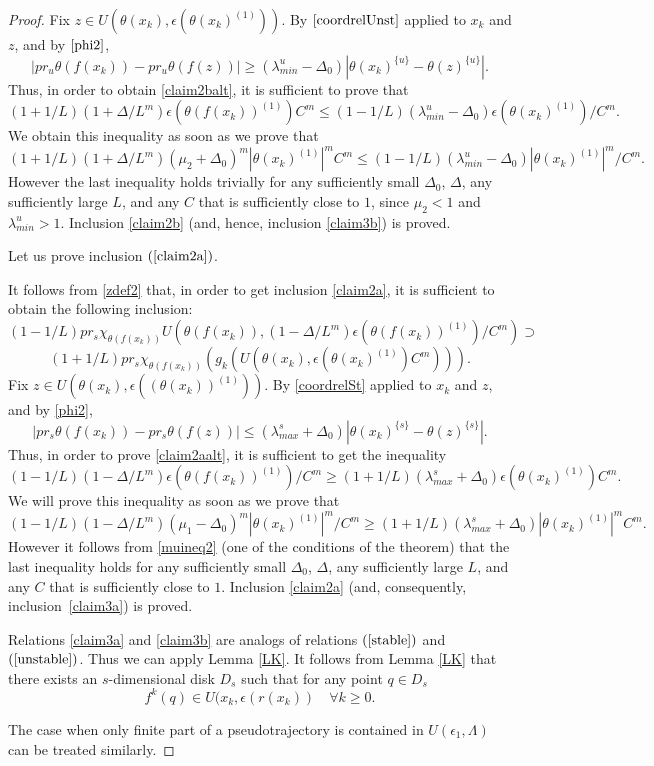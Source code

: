 \documentclass[11pt]{article}
\theoremstyle{Mystyle}
\begin{document}
\begin{proof}
Fix $z\in U(\theta(x_k),\epsilon(\theta(x_k)^{(1)}))$.
By $\eqref{coordrelUnst}$ applied to $x_k$ and $z$, and by $\eqref{phi2}$, 
$$|pr_u \theta(f(x_k)) - pr_u \theta(f(z))| \geq (\lambda^{u}_{min} - \Delta_0)|\theta(x_k)^{\{u\}} - \theta(z)^{\{u\}}|.$$
Thus, in order to obtain \eqref{claim2balt}, it is sufficient to prove that
$$(1+1/L)(1+\Delta/L^m)\epsilon(\theta(f(x_k))^{(1)})C^m \leq (1-1/L)(\lambda^{u}_{min} - \Delta_0)\epsilon(\theta(x_k)^{(1)})/C^m.$$
We obtain this inequality as soon as we prove that
$$(1+1/L)(1+\Delta/L^m)(\mu_2+\Delta_0)^m |\theta(x_k)^{(1)}|^m C^m\leq (1-1/L)(\lambda^{u}_{min} - \Delta_0)|\theta(x_k)^{(1)}|^m/C^m.$$
However the last inequality holds trivially for any sufficiently small $\Delta_0$, $\Delta$, any sufficiently large $L$, and any $C$ that is sufficiently close to $1$, since $\mu_2<1$ and $\lambda^{u}_{min}>1$. Inclusion \eqref{claim2b} (and, hence, inclusion \eqref{claim3b}) is proved.

Let us prove inclusion $(\ref{claim2a})$.

It follows from \eqref{zdef2} that, in order to get inclusion \eqref{claim2a}, it is sufficient to obtain the following inclusion:
$$
(1-1/L)pr_{s}\chi_{\theta(f(x_k))}U(\theta(f(x_k)), (1-\Delta/L^m)\epsilon(\theta(f(x_k))^{(1)})/C^m)
\supset
$$
\begin{equation}
\label{claim2aalt}
(1+1/L)pr_{s}\chi_{\theta(f(x_k))}(g_k(U(\theta(x_k),\epsilon(\theta(x_k)^{(1)})C^m))).
\end{equation}
Fix $z\in U(\theta(x_k), \epsilon((\theta(x_k))^{(1)}))$. By \eqref{coordrelSt} applied to $x_k$ and $z$, and by \eqref{phi2},
$$|pr_{s}\theta(f(x_k)) - pr_{s}\theta(f(z))|\leq (\lambda^{s}_{max} + \Delta_0)|\theta(x_k)^{\{s\}} - \theta(z)^{\{s\}}|.$$
Thus, in order to prove \eqref{claim2aalt}, it is sufficient to get the inequality
$$(1-1/L)(1-\Delta/L^m)\epsilon(\theta(f(x_k))^{(1)})/C^m \geq (1+1/L)(\lambda^{s}_{max} + \Delta_0)\epsilon(\theta(x_k)^{(1)})C^m.$$
We will prove this inequality as soon as we prove that
$$(1-1/L)(1-\Delta/L^m)(\mu_1-\Delta_0)^m|\theta(x_k)^{(1)}|^{m}/C^m\geq (1+1/L)(\lambda^{s}_{max} + \Delta_0)|\theta(x_k)^{(1)}|^{m}C^m.$$
However it follows from \eqref{muineq2} (one of the conditions of the theorem) that 
the last inequality holds for any sufficiently small $\Delta_0$, $\Delta$, any sufficiently large $L$, and any $C$ that is sufficiently close to $1$.
Inclusion \eqref{claim2a} (and, consequently, inclusion~\eqref{claim3a}) is proved.


Relations \eqref{claim3a} and \eqref{claim3b} are analogs of relations
$(\ref{stable})$ and $(\ref{unstable})$. Thus we can apply Lemma \ref{LK}.
It follows from Lemma \ref{LK} that there exists an $s$-dimensional disk $D_s$ such that for any point $q\in D_s$ 
$$f^k(q)\in U(x_{k},\epsilon(r(x_{k}))\quad\forall k\geq0.$$

The case when only finite part of a pseudotrajectory is contained in $U(\epsilon_1,\Lambda)$ can be treated similarly.


\end{proof}
\end{document}
